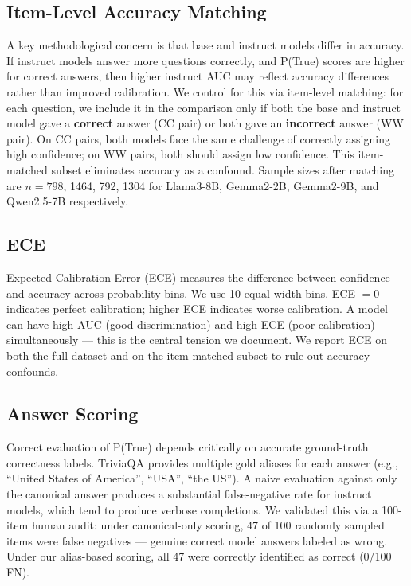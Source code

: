 \documentclass[11pt]{article}
\begin{document}
\subsection{Item-Level Accuracy Matching}

A key methodological concern is that base and instruct models differ in accuracy. If instruct models answer more questions correctly, and P(True) scores are higher for correct answers, then higher instruct AUC may reflect accuracy differences rather than improved calibration. We control for this via item-level matching: for each question, we include it in the comparison only if both the base and instruct model gave a \textbf{correct} answer (CC pair) or both gave an \textbf{incorrect} answer (WW pair). On CC pairs, both models face the same challenge of correctly assigning high confidence; on WW pairs, both should assign low confidence. This item-matched subset eliminates accuracy as a confound. Sample sizes after matching are $n=798$, 1464, 792, 1304 for Llama3-8B, Gemma2-2B, Gemma2-9B, and Qwen2.5-7B respectively.

\subsection{ECE}

Expected Calibration Error (ECE) measures the difference between confidence and accuracy across probability bins. We use 10 equal-width bins. ECE $= 0$ indicates perfect calibration; higher ECE indicates worse calibration. A model can have high AUC (good discrimination) and high ECE (poor calibration) simultaneously --- this is the central tension we document. We report ECE on both the full dataset and on the item-matched subset to rule out accuracy confounds.

\subsection{Answer Scoring}

Correct evaluation of P(True) depends critically on accurate ground-truth correctness labels. TriviaQA provides multiple gold aliases for each answer (e.g., ``United States of America'', ``USA'', ``the US''). A naive evaluation against only the canonical answer produces a substantial false-negative rate for instruct models, which tend to produce verbose completions. We validated this via a 100-item human audit: under canonical-only scoring, 47 of 100 randomly sampled items were false negatives --- genuine correct model answers labeled as wrong. Under our alias-based scoring, all 47 were correctly identified as correct (0/100 FN).
\end{document}
